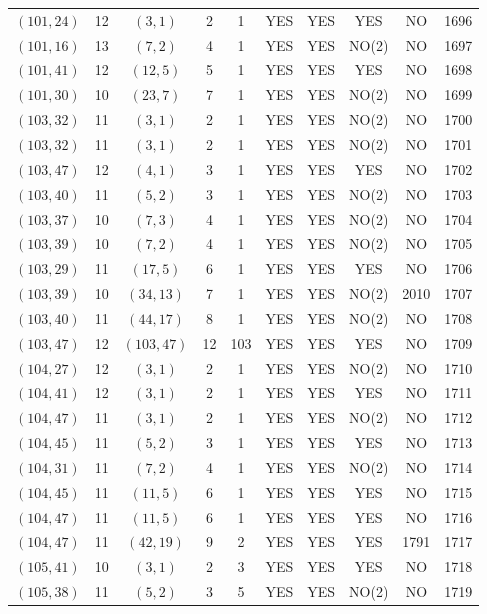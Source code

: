 \begin{longtable}{|c|c|c|c|c|c|c|c|c|c|}
$(101, 24)$ & 12 & $(3, 1)$ & 2 & 1 & YES & YES & YES & NO & 1696\\
$(101, 16)$ & 13 & $(7, 2)$ & 4 & 1 & YES & YES & NO(2) & NO & 1697\\
$(101, 41)$ & 12 & $(12, 5)$ & 5 & 1 & YES & YES & YES & NO & 1698\\
$(101, 30)$ & 10 & $(23, 7)$ & 7 & 1 & YES & YES & NO(2) & NO & 1699\\
$(103, 32)$ & 11 & $(3, 1)$ & 2 & 1 & YES & YES & NO(2) & NO & 1700\\
$(103, 32)$ & 11 & $(3, 1)$ & 2 & 1 & YES & YES & NO(2) & NO & 1701\\
$(103, 47)$ & 12 & $(4, 1)$ & 3 & 1 & YES & YES & YES & NO & 1702\\
$(103, 40)$ & 11 & $(5, 2)$ & 3 & 1 & YES & YES & NO(2) & NO & 1703\\
$(103, 37)$ & 10 & $(7, 3)$ & 4 & 1 & YES & YES & NO(2) & NO & 1704\\
$(103, 39)$ & 10 & $(7, 2)$ & 4 & 1 & YES & YES & NO(2) & NO & 1705\\
$(103, 29)$ & 11 & $(17, 5)$ & 6 & 1 & YES & YES & YES & NO & 1706\\
$(103, 39)$ & 10 & $(34, 13)$ & 7 & 1 & YES & YES & NO(2) & 2010 & 1707\\
$(103, 40)$ & 11 & $(44, 17)$ & 8 & 1 & YES & YES & NO(2) & NO & 1708\\
$(103, 47)$ & 12 & $(103, 47)$ & 12 & 103 & YES & YES & YES & NO & 1709\\
$(104, 27)$ & 12 & $(3, 1)$ & 2 & 1 & YES & YES & NO(2) & NO & 1710\\
$(104, 41)$ & 12 & $(3, 1)$ & 2 & 1 & YES & YES & YES & NO & 1711\\
$(104, 47)$ & 11 & $(3, 1)$ & 2 & 1 & YES & YES & NO(2) & NO & 1712\\
$(104, 45)$ & 11 & $(5, 2)$ & 3 & 1 & YES & YES & YES & NO & 1713\\
$(104, 31)$ & 11 & $(7, 2)$ & 4 & 1 & YES & YES & NO(2) & NO & 1714\\
$(104, 45)$ & 11 & $(11, 5)$ & 6 & 1 & YES & YES & YES & NO & 1715\\
$(104, 47)$ & 11 & $(11, 5)$ & 6 & 1 & YES & YES & YES & NO & 1716\\
$(104, 47)$ & 11 & $(42, 19)$ & 9 & 2 & YES & YES & YES & 1791 & 1717\\
$(105, 41)$ & 10 & $(3, 1)$ & 2 & 3 & YES & YES & YES & NO & 1718\\
$(105, 38)$ & 11 & $(5, 2)$ & 3 & 5 & YES & YES & NO(2) & NO & 1719\\

\end{longtable}
